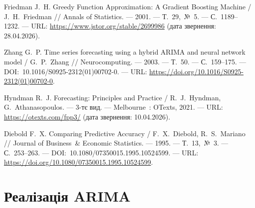 \documentclass{bachelor_thesis}
\begin{document}
\begin{enumerate}[label={[\arabic*]}, leftmargin=0pt, itemindent=0pt, labelindent=0pt]
\item Friedman J.~H. Greedy Function Approximation: A Gradient Boosting Machine / J.~H.~Friedman // Annals of Statistics. --- 2001. --- Т.~29,~№~5. --- С.~1189--1232. --- URL: \url{https://www.jstor.org/stable/2699986} (дата звернення: 28.04.2026).

\item Zhang G.~P. Time series forecasting using a hybrid ARIMA and neural network model / G.~P.~Zhang // Neurocomputing. --- 2003. --- Т.~50. --- С.~159--175. --- DOI:~10.1016/S0925-2312(01)00702-0. --- URL: \url{https://doi.org/10.1016/S0925-2312(01)00702-0}.

\item Hyndman R.~J. Forecasting: Principles and Practice / R.~J.~Hyndman, G.~Athanasopoulos. --- 3-тє вид. --- Melbourne~: OTexts, 2021. --- URL: \url{https://otexts.com/fpp3/} (дата звернення: 10.04.2026).

\item Diebold F.~X. Comparing Predictive Accuracy / F.~X.~Diebold, R.~S.~Mariano // Journal of Business~\& Economic Statistics. --- 1995. --- Т.~13,~№~3. --- С.~253--263. --- DOI:~10.1080/07350015.1995.10524599. --- URL: \url{https://doi.org/10.1080/07350015.1995.10524599}.


\end{enumerate}


\label{appendix:A}

\section{Реалізація ARIMA}
\label{sec:appendix_arima}
\end{document}
